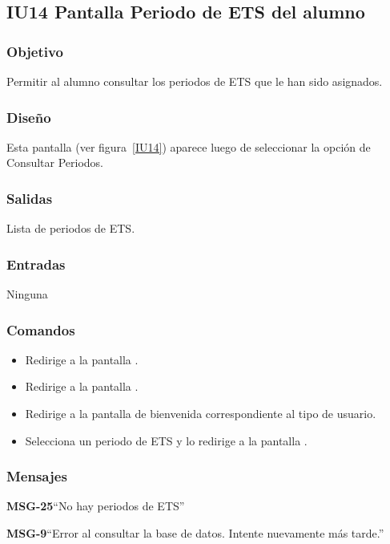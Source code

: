 \subsection{IU14 Pantalla Periodo de ETS del alumno}

\subsubsection{Objetivo}
	Permitir al alumno consultar los periodos de ETS que le han sido asignados. 

\subsubsection{Diseño}
	Esta pantalla  (ver figura~\ref{IU14}) aparece luego de seleccionar la opción de Consultar Periodos.


\subsubsection{Salidas}
	Lista de periodos de ETS. 

\subsubsection{Entradas}
Ninguna

\subsubsection{Comandos}

\begin{itemize}
	\item {} Redirige a la pantalla .
	\item {} Redirige a la pantalla .
	\item {} Redirige a la pantalla de bienvenida correspondiente al tipo de usuario.
	\item {} Selecciona un periodo de ETS y lo redirige a la pantalla .
\end{itemize}

\subsubsection{Mensajes}

\begin{Citemize}
	\item {\bf MSG-25}{``No hay periodos de ETS''}
	\item {\bf MSG-9}{``Error al consultar la base de datos. Intente nuevamente más tarde.''}
\end{Citemize}

